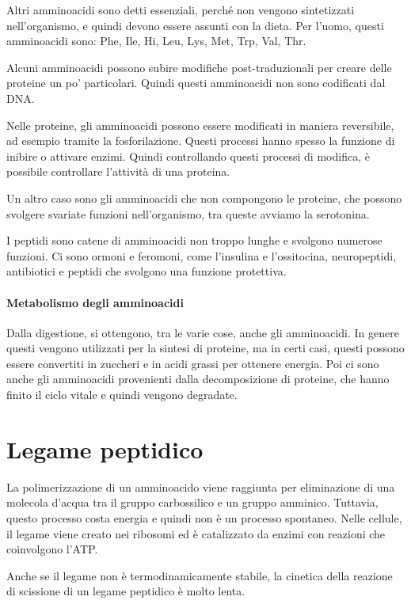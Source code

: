 Altri amminoacidi sono detti essenziali, perché non vengono sintetizzati
nell'organismo, e quindi devono essere assunti con la dieta. Per l'uomo,
questi amminoacidi sono: Phe, Ile, Hi, Leu, Lys, Met, Trp, Val, Thr.

Alcuni amminoacidi possono subire modifiche post-traduzionali per creare
delle proteine un po' particolari. Quindi questi amminoacidi non sono
codificati dal DNA.{}

Nelle proteine, gli amminoacidi possono essere modificati in maniera
reversibile, ad esempio tramite la fosforilazione. Questi processi hanno
spesso la funzione di inibire o attivare enzimi. Quindi controllando
questi processi di modifica, è possibile controllare l'attività di una
proteina.

Un altro caso sono gli amminoacidi che non compongono le proteine, che
possono svolgere svariate funzioni nell'organismo, tra queste avviamo la
serotonina.

I peptidi sono catene di amminoacidi non troppo lunghe e svolgono
numerose funzioni. Ci sono ormoni e feromoni, come l'insulina e
l'ossitocina, neuropeptidi, antibiotici e peptidi che svolgono una
funzione protettiva.

\paragraph{Metabolismo degli amminoacidi}

Dalla digestione, si ottengono, tra le varie cose, anche gli
amminoacidi. In genere questi vengono utilizzati per la sintesi di
proteine, ma in certi casi, questi possono essere convertiti in zuccheri
e in acidi grassi per ottenere energia. Poi ci sono anche gli
amminoacidi provenienti dalla decomposizione di proteine, che hanno
finito il ciclo vitale e quindi vengono degradate.

\section{Legame peptidico}

La polimerizzazione di un amminoacido viene raggiunta per eliminazione
di una molecola d'acqua tra il gruppo carbossilico e un gruppo amminico.
Tuttavia, questo processo costa energia e quindi non è un processo
spontaneo. Nelle cellule, il legame viene creato nei ribosomi ed è
catalizzato da enzimi con reazioni che coinvolgono l'ATP.{}

Anche se il legame non è termodinamicamente stabile, la cinetica della
reazione di scissione di un legame peptidico è molto lenta.

